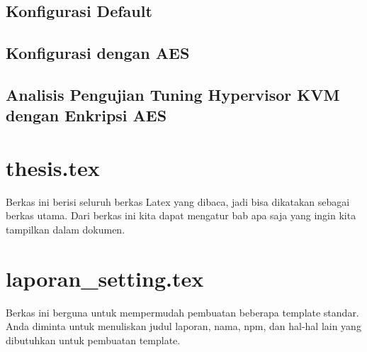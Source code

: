 \subsection{Konfigurasi Default}

\subsection{Konfigurasi dengan AES}

\subsection{Analisis Pengujian Tuning Hypervisor KVM dengan Enkripsi AES}


\iffalse

\section{thesis.tex}
Berkas ini berisi seluruh berkas Latex yang dibaca, jadi bisa dikatakan sebagai 
berkas utama. Dari berkas ini kita dapat mengatur bab apa saja yang ingin 
kita tampilkan dalam dokumen.


\section{laporan\_setting.tex}
Berkas ini berguna untuk mempermudah pembuatan beberapa template standar. 
Anda diminta untuk menuliskan judul laporan, nama, npm, dan hal-hal lain yang 
dibutuhkan untuk pembuatan template. 


